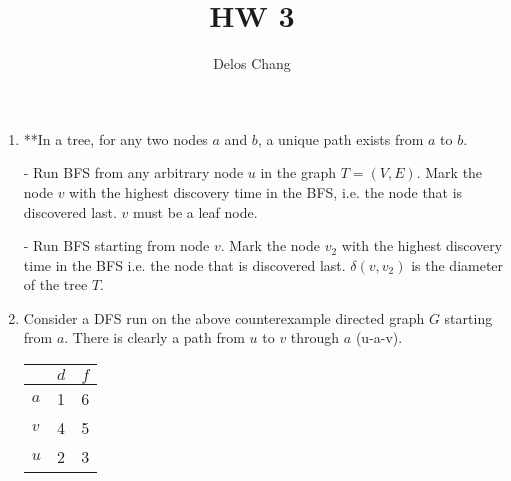 \documentclass[a4paper]{report}
\title{HW 3}
\author{Delos Chang}
\date{}
\begin{document}
  \begin{enumerate}
    \item
      **In a tree, for any two nodes $a$ and $b$, a unique path exists from $a$ to $b$.

      - Run BFS from any arbitrary node $u$ in the graph $T=(V,E)$. Mark the node $v$ with the highest discovery time in the BFS, 
      i.e. the node that is discovered last. $v$ must be a leaf node. 

      - Run BFS starting from node $v$. Mark the node $v_2$ with the highest discovery time in the BFS i.e. the node that is discovered last. 
      $\delta(v,v_2)$ is the diameter of the tree $T$. 




    \par
    \bigskip

    \item

      Consider a DFS run on the above counterexample directed graph $G$ starting from $a$.  
      There is clearly a path from $u$ to $v$ through $a$ (u-a-v).

      \begin{center}
        \begin{tabular}{ l | c | r }
          \hline
            & $d$ & $f$ \\ \hline
          $a$ & 1 & 6 \\
          $v$ & 4 & 5 \\
          $u$ & 2 & 3 \\
          \hline  
        \end{tabular}
      \end{center}


\end{enumerate}
\end{document}
